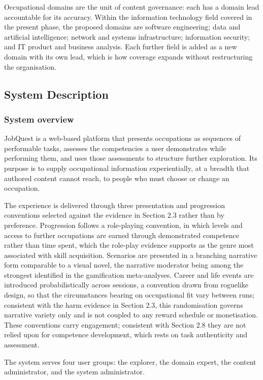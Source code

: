Occupational domains are the unit of content governance: each has a domain lead accountable for its accuracy. Within the information technology field covered in the present phase, the proposed domains are software engineering; data and artificial intelligence; network and systems infrastructure; information security; and IT product and business analysis. Each further field is added as a new domain with its own lead, which is how coverage expands without restructuring the organisation.

\subsection{System Description}

\subsubsection{System overview}

JobQuest is a web-based platform that presents occupations as sequences of performable tasks, assesses the competencies a user demonstrates while performing them, and uses those assessments to structure further exploration. Its purpose is to supply occupational information experientially, at a breadth that authored content cannot reach, to people who must choose or change an occupation.

The experience is delivered through three presentation and progression conventions selected against the evidence in Section 2.3 rather than by preference. Progression follows a role-playing convention, in which levels and access to further occupations are earned through demonstrated competence rather than time spent, which the role-play evidence supports as the genre most associated with skill acquisition. Scenarios are presented in a branching narrative form comparable to a visual novel, the narrative moderator being among the strongest identified in the gamification meta-analyses. Career and life events are introduced probabilistically across sessions, a convention drawn from roguelike design, so that the circumstances bearing on occupational fit vary between runs; consistent with the harm evidence in Section 2.3, this randomisation governs narrative variety only and is not coupled to any reward schedule or monetisation. These conventions carry engagement; consistent with Section 2.8 they are not relied upon for competence development, which rests on task authenticity and assessment.

The system serves four user groups: the explorer, the domain expert, the content administrator, and the system administrator.

